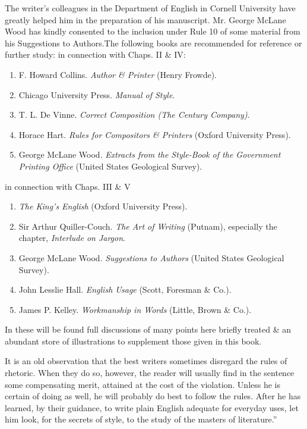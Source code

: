 \documentclass{article}
\begin{document}
The writer's colleagues in the Department of English in Cornell University have greatly helped him in the preparation of his manuscript. Mr. George McLane Wood has kindly consented to the inclusion under Rule 10 of some material from his Suggestions to Authors.The following books are recommended for reference or further study: in connection with Chaps. II \& IV:
\begin{enumerate}
	\item F. Howard Collins. {\it Author \& Printer} (Henry Frowde).
	\item Chicago University Press. {\it Manual of Style}.
	\item T. L. De Vinne. {\it Correct Composition (The Century Company)}.
	\item Horace Hart. {\it Rules for Compositors \& Printers} (Oxford University Press).
	\item George McLane Wood. {\it Extracts from the Style-Book of the Government Printing Office} (United States Geological Survey).
\end{enumerate}
in connection with Chaps. III \& V
\begin{enumerate}
	\item {\it The King's English} (Oxford University Press).
	\item Sir Arthur Quiller-Couch. {\it The Art of Writing} (Putnam), especially the chapter, {\it Interlude on Jargon}.
	\item George McLane Wood. {\it Suggestions to Authors} (United States Geological Survey).
	\item John Lesslie Hall. {\it English Usage} (Scott, Foresman \& Co.).
	\item James P. Kelley. {\it Workmanship in Words} (Little, Brown \& Co.).
\end{enumerate}
In these will be found full discussions of many points here briefly treated \& an abundant store of illustrations to supplement those given in this book.

It is an old observation that the best writers sometimes disregard the rules of rhetoric. When they do so, however, the reader will usually find in the sentence some compensating merit, attained at the cost of the violation. Unless he is certain of doing as well, he will probably do best to follow the rules. After he has learned, by their guidance, to write plain English adequate for everyday uses, let him look, for the secrets of style, to the study of the masters of literature.''

\end{document}
